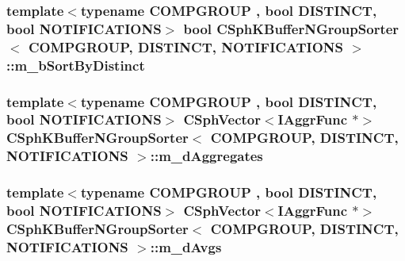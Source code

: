 \hypertarget{classCSphKBufferNGroupSorter_a998b99daf43e28edc920237c62e692db}{
\subsubsection[{m\-\_\-b\-Sort\-By\-Distinct}]{\setlength{\rightskip}{0pt plus 5cm}template$<$typename C\-O\-M\-P\-G\-R\-O\-U\-P , bool D\-I\-S\-T\-I\-N\-C\-T, bool N\-O\-T\-I\-F\-I\-C\-A\-T\-I\-O\-N\-S$>$ bool {\bf C\-Sph\-K\-Buffer\-N\-Group\-Sorter}$<$ C\-O\-M\-P\-G\-R\-O\-U\-P, D\-I\-S\-T\-I\-N\-C\-T, N\-O\-T\-I\-F\-I\-C\-A\-T\-I\-O\-N\-S $>$\-::m\-\_\-b\-Sort\-By\-Distinct\hspace{0.3cm}{\ttfamily [protected]}}}\label{classCSphKBufferNGroupSorter_a998b99daf43e28edc920237c62e692db}
\hypertarget{classCSphKBufferNGroupSorter_a1b9ae0c8bfc629e850f8be009d895e30}{
\subsubsection[{m\-\_\-d\-Aggregates}]{\setlength{\rightskip}{0pt plus 5cm}template$<$typename C\-O\-M\-P\-G\-R\-O\-U\-P , bool D\-I\-S\-T\-I\-N\-C\-T, bool N\-O\-T\-I\-F\-I\-C\-A\-T\-I\-O\-N\-S$>$ {\bf C\-Sph\-Vector}$<${\bf I\-Aggr\-Func} $\ast$$>$ {\bf C\-Sph\-K\-Buffer\-N\-Group\-Sorter}$<$ C\-O\-M\-P\-G\-R\-O\-U\-P, D\-I\-S\-T\-I\-N\-C\-T, N\-O\-T\-I\-F\-I\-C\-A\-T\-I\-O\-N\-S $>$\-::m\-\_\-d\-Aggregates\hspace{0.3cm}{\ttfamily [protected]}}}\label{classCSphKBufferNGroupSorter_a1b9ae0c8bfc629e850f8be009d895e30}
\hypertarget{classCSphKBufferNGroupSorter_a14b376d31c74ed1bd99587aa91c7a68f}{
\subsubsection[{m\-\_\-d\-Avgs}]{\setlength{\rightskip}{0pt plus 5cm}template$<$typename C\-O\-M\-P\-G\-R\-O\-U\-P , bool D\-I\-S\-T\-I\-N\-C\-T, bool N\-O\-T\-I\-F\-I\-C\-A\-T\-I\-O\-N\-S$>$ {\bf C\-Sph\-Vector}$<${\bf I\-Aggr\-Func} $\ast$$>$ {\bf C\-Sph\-K\-Buffer\-N\-Group\-Sorter}$<$ C\-O\-M\-P\-G\-R\-O\-U\-P, D\-I\-S\-T\-I\-N\-C\-T, N\-O\-T\-I\-F\-I\-C\-A\-T\-I\-O\-N\-S $>$\-::m\-\_\-d\-Avgs\hspace{0.3cm}{\ttfamily [protected]}}}\label{classCSphKBufferNGroupSorter_a14b376d31c74ed1bd99587aa91c7a68f}
